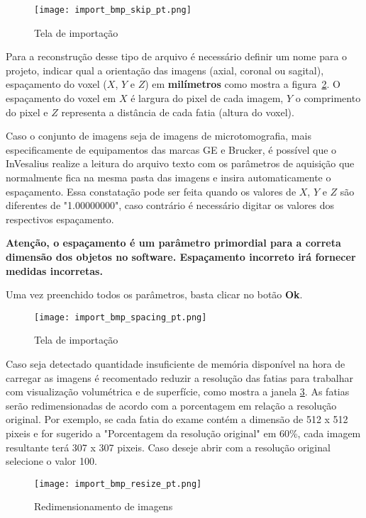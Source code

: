 \begin{figure}[!htb]
\centering
\texttt{[image: import\_bmp\_skip\_pt.png]}
\caption{Tela de importação}
\label{fig:import_bmp_skip_pt}
\end{figure}

Para a reconstrução desse tipo de arquivo é necessário definir um nome para o projeto, indicar qual a orientação das imagens (axial, coronal ou sagital), espaçamento do voxel ($X$, $Y$ e $Z$) em \textbf{milímetros} como mostra a figura~\ref{fig:import_bmp_spacing_pt}. O espaçamento do voxel em $X$ é largura do pixel de cada imagem, $Y$ o comprimento do pixel e $Z$ representa a distância de cada fatia (altura do voxel). 

Caso o conjunto de imagens seja de imagens de microtomografia, mais especificamente de equipamentos das marcas GE e Brucker, é possível que o InVesalius realize a leitura do arquivo texto com os parâmetros de aquisição que normalmente fica na mesma pasta das imagens e insira automaticamente o espaçamento. Essa constatação pode ser feita quando os valores de $X$, $Y$ e $Z$ são diferentes de "1.00000000", caso contrário é necessário digitar os valores dos respectivos espaçamento. 

\textbf{Atenção, o espaçamento é um parâmetro primordial para a correta dimensão dos objetos no software. Espaçamento incorreto irá fornecer medidas incorretas.}

Uma vez preenchido todos os parâmetros, basta clicar no botão \textbf{Ok}.

\begin{figure}[!htb]
\centering
\texttt{[image: import\_bmp\_spacing\_pt.png]}
\caption{Tela de importação}
\label{fig:import_bmp_spacing_pt}
\end{figure}

Caso seja detectado quantidade insuficiente de memória disponível na hora de carregar as imagens é recomentado  reduzir a resolução das fatias para trabalhar com visualização volumétrica e de superfície, como mostra a janela \ref{fig:import_bmp_resize_pt}.  As fatias serão redimensionadas de acordo com a porcentagem em relação a resolução original. Por exemplo,  se cada fatia do exame contém a dimensão de 512 x 512 pixeis e for sugerido a "Porcentagem da resolução original" em 60\%, cada imagem resultante terá 307 x 307 pixeis. Caso deseje abrir com a resolução original selecione o valor 100.

\begin{figure}[!htb]
\centering
\texttt{[image: import\_bmp\_resize\_pt.png]}
\caption{Redimensionamento de imagens}
\label{fig:import_bmp_resize_pt}
\end{figure}


